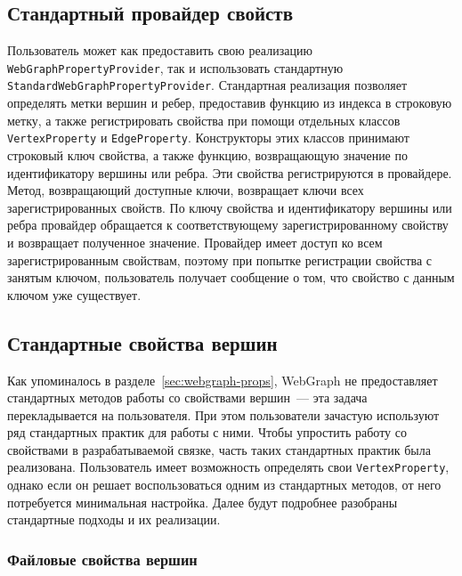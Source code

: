 \documentclass[times,specification,annotation]{itmo-student-thesis}
\begin{document}
\subsection{Стандартный провайдер свойств}

Пользователь может как предоставить свою реализацию \texttt{WebGraphPropertyProvider}, так и использовать стандартную \texttt{StandardWebGraphPropertyProvider}. Стандартная реализация позволяет определять метки вершин и ребер, предоставив функцию из индекса в строковую метку, а также регистрировать свойства при помощи отдельных классов \texttt{VertexProperty} и \texttt{EdgeProperty}. Конструкторы этих классов принимают строковый ключ свойства, а также функцию, возвращающую значение по идентификатору вершины или ребра.
Эти свойства регистрируются в провайдере. Метод, возвращающий доступные ключи, возвращает ключи всех зарегистрированных свойств. По ключу свойства и идентификатору вершины или ребра провайдер обращается к соответствующему зарегистрированному свойству и возвращает полученное значение. Провайдер имеет доступ ко всем зарегистрированным свойствам, поэтому при попытке регистрации свойства с занятым ключом, пользователь получает сообщение о том, что свойство с данным ключом уже существует.

\subsection{Стандартные свойства вершин}

Как упоминалось в разделе~\ref{sec:webgraph-props}, WebGraph не предоставляет стандартных методов работы со свойствами вершин~--- эта задача перекладывается на пользователя. При этом пользователи зачастую используют ряд стандартных практик для работы с ними. Чтобы упростить работу со свойствами в разрабатываемой связке, часть таких стандартных практик была реализована. Пользователь имеет возможность определять свои \texttt{VertexProperty}, однако если он решает воспользоваться одним из стандартных методов, от него потребуется минимальная настройка. Далее будут подробнее разобраны стандартные подходы и их реализации. 

\subsubsection{Файловые свойства вершин}
\end{document}
